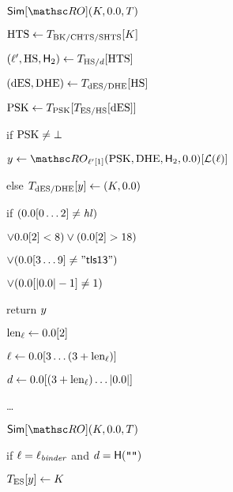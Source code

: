 \begin{figure}[tp]
\begin{minipage}[t]{0.48\textwidth}
\begin{oracle}{$\Sim[\RO](\hmackey, \hmactext, \rlookuptable)$}
		\item \quad \quad $\mathrm{HTS} \gets T_{\mathrm{BK}/\mathrm{CHTS}/\mathrm{SHTS}}[K]$
		\item \quad $(\ell', \mathrm{HS}, \mathsf{H}_2) \gets T_{\mathrm{HS}/d}[\mathrm{HTS}]$
		\item \quad $(\mathrm{dES}, \mathrm{DHE}) \gets T_{\mathrm{dES}/\mathrm{DHE}}[\mathrm{HS}]$
		\item \quad $\mathrm{PSK} \gets T_{\mathrm{PSK}}[T_{\mathrm{ES}/\mathrm{HS}}[ \mathrm{dES}]]$
		\item \quad if $\mathrm{PSK} \neq \bot$ 
		\item \quad \quad $y \gets \RO_{\kdflbl'[1]}(\psk, \dhe,  \hash_2, \hmactext)[	\lblT(\kdflbl)]$
		
		\item else $\rlookuptable_{\des/\dhe}[\simOut] \gets(\hmackey, \hmactext)$
		
		\item if $(\hmactext[0\ldots2] \neq \hashlen)$
		\item[]\quad$\vee\hmactext[2] < 8) \vee(\hmactext[2] > 18)$
		\item[] \quad $\vee(\hmactext[3\ldots9] \neq \mathsf{"tls13 "})$
		\item[]\quad$\vee (\hmactext[|\hmactext|-1] \neq  1)$ 
		\item[] \quad {}
		
		\item \qquad return $y$
		
		\item[]  
		\item $\kdflbllen \gets \hmactext[2]$
		\item $\kdflbl \gets \hmactext[3\ldots (3+\kdflbllen)]$
		\item $\hashcontext \gets \hmactext[(3+\kdflbllen)\ldots|\hmactext|]$
		\item[] \ldots {}
		\end{oracle}
		
			
		\end{minipage}
		\begin{minipage}[t]{0.49\textwidth}
			\ExptSepSpace
			\begin{oracle}{$\simulator[\RO](\hmackey, \hmactext, \rlookuptable)$}
			\item if $\ell = \ell_{\mathit{binder}}$ and $d = \mathsf{H}(\texttt{""})$
			\item \quad  $T_{\mathrm{ES}}[y] \gets K$
			

\end{oracle}
\end{minipage}
\end{figure}

